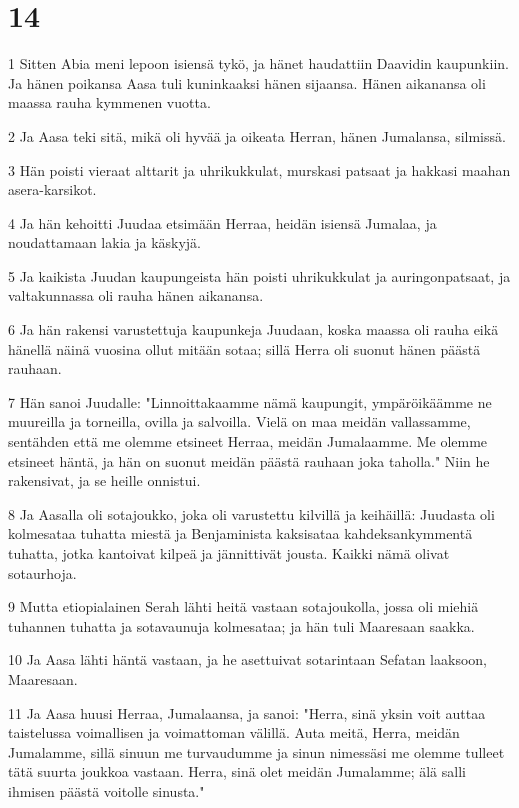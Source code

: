 \chapter{14}

\par 1 Sitten Abia meni lepoon isiensä tykö, ja hänet haudattiin Daavidin kaupunkiin. Ja hänen poikansa Aasa tuli kuninkaaksi hänen sijaansa. Hänen aikanansa oli maassa rauha kymmenen vuotta.
\par 2 Ja Aasa teki sitä, mikä oli hyvää ja oikeata Herran, hänen Jumalansa, silmissä.
\par 3 Hän poisti vieraat alttarit ja uhrikukkulat, murskasi patsaat ja hakkasi maahan asera-karsikot.
\par 4 Ja hän kehoitti Juudaa etsimään Herraa, heidän isiensä Jumalaa, ja noudattamaan lakia ja käskyjä.
\par 5 Ja kaikista Juudan kaupungeista hän poisti uhrikukkulat ja auringonpatsaat, ja valtakunnassa oli rauha hänen aikanansa.
\par 6 Ja hän rakensi varustettuja kaupunkeja Juudaan, koska maassa oli rauha eikä hänellä näinä vuosina ollut mitään sotaa; sillä Herra oli suonut hänen päästä rauhaan.
\par 7 Hän sanoi Juudalle: "Linnoittakaamme nämä kaupungit, ympäröikäämme ne muureilla ja torneilla, ovilla ja salvoilla. Vielä on maa meidän vallassamme, sentähden että me olemme etsineet Herraa, meidän Jumalaamme. Me olemme etsineet häntä, ja hän on suonut meidän päästä rauhaan joka taholla." Niin he rakensivat, ja se heille onnistui.
\par 8 Ja Aasalla oli sotajoukko, joka oli varustettu kilvillä ja keihäillä: Juudasta oli kolmesataa tuhatta miestä ja Benjaminista kaksisataa kahdeksankymmentä tuhatta, jotka kantoivat kilpeä ja jännittivät jousta. Kaikki nämä olivat sotaurhoja.
\par 9 Mutta etiopialainen Serah lähti heitä vastaan sotajoukolla, jossa oli miehiä tuhannen tuhatta ja sotavaunuja kolmesataa; ja hän tuli Maaresaan saakka.
\par 10 Ja Aasa lähti häntä vastaan, ja he asettuivat sotarintaan Sefatan laaksoon, Maaresaan.
\par 11 Ja Aasa huusi Herraa, Jumalaansa, ja sanoi: "Herra, sinä yksin voit auttaa taistelussa voimallisen ja voimattoman välillä. Auta meitä, Herra, meidän Jumalamme, sillä sinuun me turvaudumme ja sinun nimessäsi me olemme tulleet tätä suurta joukkoa vastaan. Herra, sinä olet meidän Jumalamme; älä salli ihmisen päästä voitolle sinusta."
